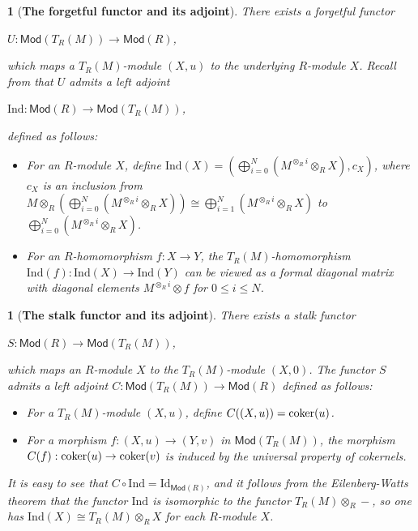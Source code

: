 \documentclass[10pt,twoside]{amsart}
\theoremstyle{bfupright head,slanted body}
\theoremstyle{bfupright head,upright body}
\newtheorem{bfhpg}[res]{}               \newtheorem*{bfhpg*}{}
\theoremstyle{fixed bf head,slanted body}
\theoremstyle{fixed bf head,upright body}
\theoremstyle{numbered paragraph}
\numberwithin{equation}{res}
\newcommand{\Mod}{\mathsf{Mod}}
\newcommand{\Ind}{\mathrm{Ind}}
\newcommand{\Id}{\mathrm{Id}}
\newcommand{\cok}{\mbox{\rm coker}}
\newcommand{\is}{\cong}
\begin{document}
\begin{bfhpg}[\bf The forgetful functor and its adjoint]
\label{The forgetful functor and its}
There exists a \emph{forgetful functor}
\begin{center}
$U: \Mod(T_R(M))\to \Mod(R)$,
\end{center}
which maps a  $T_R(M)$-module $(X,u)$ to the underlying $R$-module $X$.
Recall from \cite[Lemma 2.1]{CL} that $U$ admits a left adjoint
\begin{center}
$\Ind: \Mod(R) \to \Mod(T_R(M))$,
\end{center}
defined as follows:
\begin{itemize}
\item For an $R$-module $X$, define
$\Ind(X)=(\bigoplus_{i=0}^N(M^{\otimes_Ri}\otimes_RX),c_X)$,
where $c_X$ is an inclusion from
$M\otimes_R(\bigoplus_{i=0}^N(M^{\otimes_Ri}\otimes_RX))\cong
\bigoplus_{i=1}^N(M^{\otimes_Ri}\otimes_RX)$
to
$\bigoplus_{i=0}^N(M^{\otimes_Ri}\otimes_RX)$.
\item For an $R$-homomorphism $f: X \to Y$,
the $T_R(M)$-homomorphism $\Ind(f): \Ind(X) \to \Ind(Y)$ can be viewed as
a formal diagonal matrix with diagonal elements
$M^{\otimes_Ri}\otimes f$ for $0 \leqslant i\leqslant N$.
\end{itemize}
\end{bfhpg}

\begin{bfhpg}[\bf The stalk functor and its adjoint]
\label{The stalk functor and its adjoints}
There exists a \emph{stalk functor}
\begin{center}
$S: \Mod(R)\to \Mod(T_R(M))$,
\end{center}
which maps an $R$-module $X$ to the  $T_R(M)$-module $(X, 0)$.
The functor $S$ admits a left adjoint
$C: \Mod(T_R(M)) \to \Mod(R)$ defined as follows:
\begin{itemize}
\item For a  $T_R(M)$-module $(X,u)$, define $C((X,u))=\cok(u)$.
\item For a morphism $f: (X,u) \to (Y,v)$ in $\Mod(T_R(M))$, the morphism
$C(f) : \cok(u) \to \cok(v)$ is induced by the universal property of cokernels.
\end{itemize}

It is easy to see that $C\circ\Ind=\Id_{\Mod(R)}$, and
it follows from the Eilenberg-Watts theorem that the functor $\Ind$ is isomorphic to the functor $T_R(M)\otimes_R-$, so one has $\Ind(X)\is T_R(M)\otimes_RX$ for each $R$-module $X$.
\end{bfhpg}
\end{document}
